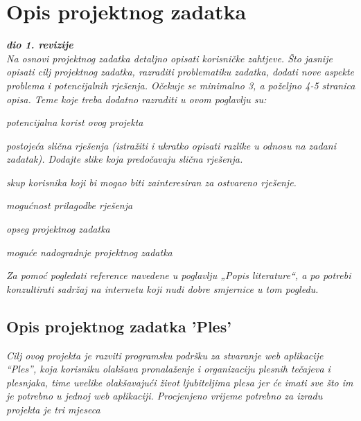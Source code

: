 \chapter{Opis projektnog zadatka}
\usepackage{graphicx}

\textbf{\textit{dio 1. revizije}}\\

\textit{Na osnovi projektnog zadatka detaljno opisati korisničke zahtjeve. Što jasnije opisati cilj projektnog zadatka, razraditi problematiku zadatka, dodati nove aspekte problema i potencijalnih rješenja. Očekuje se minimalno 3, a poželjno 4-5 stranica opisa.	Teme koje treba dodatno razraditi u ovom poglavlju su:}
\begin{packed_item}
	\item \textit{potencijalna korist ovog projekta}
	\item \textit{postojeća slična rješenja (istražiti i ukratko opisati razlike u odnosu na zadani zadatak). Dodajte slike koja predočavaju slična rješenja.}
	\item \textit{skup korisnika koji bi mogao biti zainteresiran za ostvareno rješenje.}
	\item \textit{mogućnost prilagodbe rješenja }
	\item \textit{opseg projektnog zadatka}
	\item \textit{moguće nadogradnje projektnog zadatka}
\end{packed_item}

\textit{Za pomoć pogledati reference navedene u poglavlju „Popis literature“, a po potrebi konzultirati sadržaj na internetu koji nudi dobre smjernice u tom pogledu.}
\eject

\section{Opis projektnog zadatka 'Ples'}

\textit{Cilj ovog projekta je razviti programsku podršku za stvaranje web aplikacije “Ples”, koja korisniku olakšava pronalaženje i organizaciju plesnih tečajeva i plesnjaka, time uvelike olakšavajući život ljubiteljima plesa jer će imati sve što im je potrebno u jednoj web aplikaciji. Procjenjeno vrijeme potrebno za izradu projekta je tri mjeseca}

